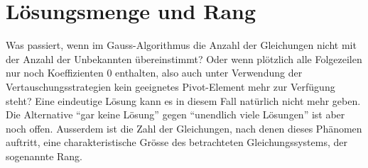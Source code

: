 %
%
%
\section{Lösungsmenge und Rang}
Was passiert, wenn im Gauss-Algorithmus die Anzahl der Gleichungen
nicht mit der Anzahl der Unbekannten übereinstimmt? Oder wenn
plötzlich alle Folgezeilen nur noch Koeffizienten $0$ enthalten,
also auch unter Verwendung der Vertauschungsstrategien kein geeignetes
Pivot-Element mehr zur Verfügung steht? Eine eindeutige Lösung kann
es in diesem Fall natürlich nicht mehr geben.
Die Alternative ``gar keine Lösung'' gegen ``unendlich viele Lösungen''
ist aber noch offen.
Ausserdem ist die Zahl der Gleichungen, nach denen dieses Phänomen
auftritt, eine charakteristische Grösse des betrachteten Gleichungssystems,
der sogenannte Rang.

